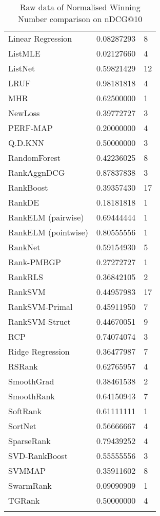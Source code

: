 \begin{longtable}{l|l|l}
Linear Regression & 0.08287293 & 8 \\ 
List\acs{MLE} & 0.02127660 & 4 \\ 
ListNet & 0.59821429 & 12 \\ 
LRUF & 0.98181818 & 4 \\ 
MHR & 0.62500000 & 1 \\ 
NewLoss & 0.39772727 & 3 \\ 
PERF-\acs{MAP} & 0.20000000 & 4 \\ 
Q.D.\acs{KNN} & 0.50000000 & 3 \\ 
RandomForest & 0.42236025 & 8 \\ 
RankAgg\acs{nDCG} & 0.87837838 & 3 \\ 
RankBoost & 0.39357430 & 17 \\ 
RankDE & 0.18181818 & 1 \\ 
RankELM (pairwise) & 0.69444444 & 1 \\ 
RankELM (pointwise) & 0.80555556 & 1 \\ 
RankNet & 0.59154930 & 5 \\ 
Rank-PMBGP & 0.27272727 & 1 \\ 
Rank\acs{RLS} & 0.36842105 & 2 \\ 
Rank\acs{SVM} & 0.44957983 & 17 \\ 
Rank\acs{SVM}-Primal & 0.45911950 & 7 \\ 
Rank\acs{SVM}-Struct & 0.44670051 & 9 \\ 
RCP & 0.74074074 & 3 \\ 
Ridge Regression & 0.36477987 & 7 \\ 
RSRank & 0.62765957 & 4 \\ 
SmoothGrad & 0.38461538 & 2 \\ 
SmoothRank & 0.64150943 & 7 \\ 
SoftRank & 0.61111111 & 1 \\ 
SortNet & 0.56666667 & 4 \\ 
SparseRank & 0.79439252 & 4 \\ 
\acs{SVD}-RankBoost & 0.55555556 & 3 \\ 
\acs{SVM}\acs{MAP} & 0.35911602 & 8 \\ 
SwarmRank & 0.09090909 & 1 \\ 
TGRank & 0.50000000 & 4 \\ 
\caption{Raw data of Normalised Winning Number comparison on \acs{nDCG}@10}
\label{tab:raw_data_norm_winnum_ndcg10}
\end{longtable}
